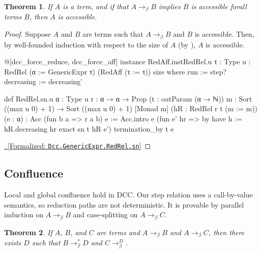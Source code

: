 \documentclass{article}
\newtheorem{theorem}{Theorem}
\newcommand{\leanlink}[2]{
  \hfill \href{#1}{\textcolor{leanblue}\faCheckSquare~[Formalized: \texttt{#2}]}%
}
\newcommand{\arr}{\rightarrow}
\newcommand{\barr}{\arr_{\beta}}
\begin{document}
\begin{theorem}
  If \(A\) is a term, and if that \(A \barr B\) implies \(B\) is accessible forall terms \(B\), then  \(A\) is accessible.
\end{theorem}

\begin{proof}
  Suppose \(A\) and \(B\) are terms such that \(A \barr B\) and \(B\) is accessible. Then, by well-founded induction with respect to the size of \(A\) (by \label{thm:dec}), \(A\) is accessible.

\begin{leancode}
@[dcc_force_reduce, dcc_force_aff]
instance RedAff.instRedRel.{u} {τ : Type u} : RedRel (α := GenericExpr τ) (RedAff (τ := τ)) size where
  run := step?
  decreasing := decreasing'

def RedRel.sn.{u} {α : Type u} {r : α → α → Prop} (t : outParam (α → ℕ))
  {m : Sort ((max u 0) + 1) → Sort ((max u 0) + 1)} [Monad m]
  (hR : RedRel r t (m := m)) (e : α) : Acc (fun b a => r a b) e := Acc.intro e (fun e' hr => by
    have h := hR.decreasing hr
    exact sn t hR e')
termination_by t e
\end{leancode}

\hfill\leanlink{https://github.com/lexzaiello/DCC/blob/05b05784d7e7b2e9070a7edbd6b024f613c80448/Dcc/Relation.lean\#L99}{Dcc.GenericExpr.RedRel.sn}
\end{proof}

\subsection{Confluence}

Local and global confluence hold in DCC. Our step relation uses a call-by-value semantics, so reduction paths are not deterministic. It is provable by parallel induction on \(A \barr B\) and case-splitting on \(A \barr C\).

\begin{theorem} \label{thm:conf}
  If \(A\), \(B\), and \(C\) are terms and \(A \barr B\) and \(A \barr C\), then there exists \(D\) such that \(B \barr^{*} D\) and \(C \barr^{D}\).
\end{theorem}
\end{document}
